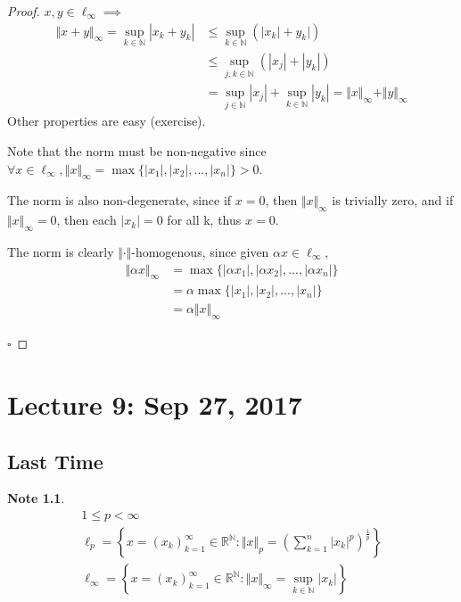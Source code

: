 \documentclass[11pt, oneside]{book}
\theoremstyle{break}
\newtheorem*{proof}{Proof}
\newtheorem*{note}{Note}
\newcommand{\bb}[1]{\mathbb{#1}}			%
\newcommand{\qed}{\hfill\ensuremath{\square}}	%
\begin{document}
\begin{proof}
	$x, y \in \ell_\infty \implies$
	\begin{align*}
		\Vert x + y\Vert _\infty = \sup_{k \in \bb{N}} |x_k + y_k| &\leq \sup_{k \in \bb{N}} (|x_k| + y_k|) \\
				&\leq \sup_{j, k \in \bb{N}} (|x_j| + |y_k|) \\
				&= \sup_{j \in \bb{N}} |x_j| + \sup_{k \in \bb{N}} |y_k| = \Vert x\Vert _\infty + \Vert y\Vert _\infty
	\end{align*}
	Other properties are easy (exercise).

	\begin{tcolorbox}
		Note that the norm must be non-negative since $\forall x \in \ell_\infty, \Vert x \Vert_\infty = \max\{|x_1|, |x_2|, ..., |x_n| \} > 0$.

		The norm is also non-degenerate, since if $x = 0$, then $\Vert x \Vert_\infty$ is trivially zero, and if $\Vert x \Vert_\infty = 0$, then each $|x_k| = 0$ for all k, thus $x = 0$.

		The norm is clearly $\Vert \cdot \Vert $-homogenous, since given $\alpha x \in \ell_\infty$,
		\begin{align*}
			\Vert \alpha x \Vert_\infty &= \max\{|\alpha x_1|, |\alpha x_2|, ..., |\alpha x_n| \} \\
				&= \alpha \max\{|x_1|, |x_2|, ..., |x_n| \} \\
				&= \alpha \Vert x \Vert_\infty
		\end{align*}
	\end{tcolorbox}
	\qed
\end{proof}

\chapter{Lecture 9: Sep 27, 2017}\label{chp:lec9}

\section{Last Time}

\begin{note}
	\begin{gather*}
		1 \leq p < \infty \\
		\ell_p = \left\{x = (x_k)_{k = 1}^\infty \in \bb{R}^\bb{N} : \Vert x\Vert _p = \left(\sum_{k=1}^{n} |x_k|^p \right)^{\frac{1}{p}} \right\} \\
		\ell_\infty = \left\{ x = (x_k)_{k = 1}^\infty \in \bb{R}^\bb{N} : \Vert x\Vert _\infty = \sup_{k \in \bb{N}}|x_k| \right\}
	\end{gather*}
\end{note}
\end{document}
